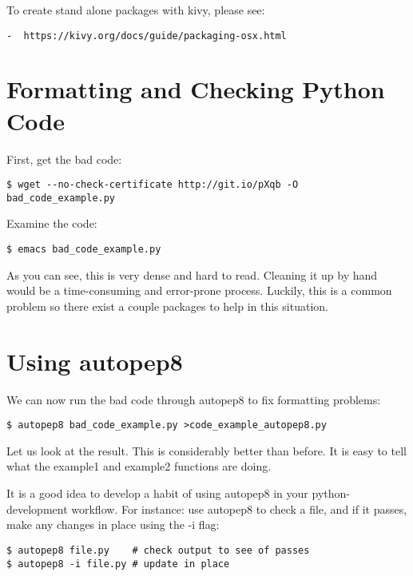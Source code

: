 To create stand alone packages with kivy, please see:

\begin{verbatim}
-  https://kivy.org/docs/guide/packaging-osx.html
\end{verbatim}

\section{Formatting and Checking Python
Code}\label{formatting-and-checking-python-code}

First, get the bad code:

\begin{verbatim}
$ wget --no-check-certificate http://git.io/pXqb -O bad_code_example.py
\end{verbatim}

Examine the code:

\begin{verbatim}
$ emacs bad_code_example.py
\end{verbatim}

As you can see, this is very dense and hard to read. Cleaning it up by
hand would be a time-consuming and error-prone process. Luckily, this is
a common problem so there exist a couple packages to help in this
situation.

\section{Using autopep8}\label{using-autopep8}

We can now run the bad code through autopep8 to fix formatting problems:

\begin{verbatim}
$ autopep8 bad_code_example.py >code_example_autopep8.py
\end{verbatim}

Let us look at the result. This is considerably better than before. It
is easy to tell what the example1 and example2 functions are doing.

It is a good idea to develop a habit of using autopep8 in your
python-development workflow. For instance: use autopep8 to check a file,
and if it passes, make any changes in place using the -i flag:

\begin{verbatim}
$ autopep8 file.py    # check output to see of passes
$ autopep8 -i file.py # update in place
\end{verbatim}

